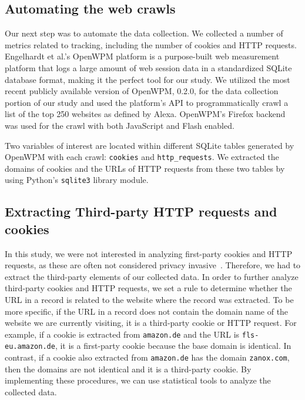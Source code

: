 \documentclass[conference]{IEEEtran}
\begin{document}
\subsection{Automating the web crawls}

Our next step was to automate the data collection.  We collected a number of metrics related to tracking, including the number of cookies and HTTP requests. Engelhardt et al.'s OpenWPM platform is a purpose-built web measurement platform that logs a large amount of web session data in a standardized SQLite database format, making it the perfect tool for our study. We utilized the most recent publicly available version of OpenWPM, 0.2.0, for the data collection portion of our study and used the platform's API to programmatically crawl a list of the top 250 websites as defined by Alexa\cite{Alexa}. OpenWPM's Firefox backend was used for the crawl with both JavaScript and Flash enabled.

Two variables of interest are located within different SQLite tables generated by OpenWPM with each crawl: \texttt{cookies} and \texttt{http\_requests}. We extracted the domains of cookies and the URLs of HTTP requests from these two tables by using Python's \texttt{sqlite3} library module.

\subsection{Extracting Third-party HTTP requests and cookies}

In this study, we were not interested in analyzing first-party cookies and HTTP requests, as these are often not considered privacy invasive~\cite{mcdonald2011track}. Therefore, we had to extract the third-party elements of our collected data. In order to further analyze third-party cookies and HTTP requests, we set a rule to determine whether the URL in a record is related to the website where the record was extracted. To be more specific, if the URL in a record does not contain the domain name of the website we are currently visiting, it is a third-party cookie or HTTP request. For example, if a cookie is extracted from \texttt{amazon.de} and the URL is \texttt{fls-eu.amazon.de}, it is a first-party cookie because the base domain is identical. In contrast, if a cookie also extracted from \texttt{amazon.de} has the domain \texttt{zanox.com}, then the domains are not identical and it is a third-party cookie. By implementing these procedures, we can use statistical tools to analyze the collected data.
\end{document}
